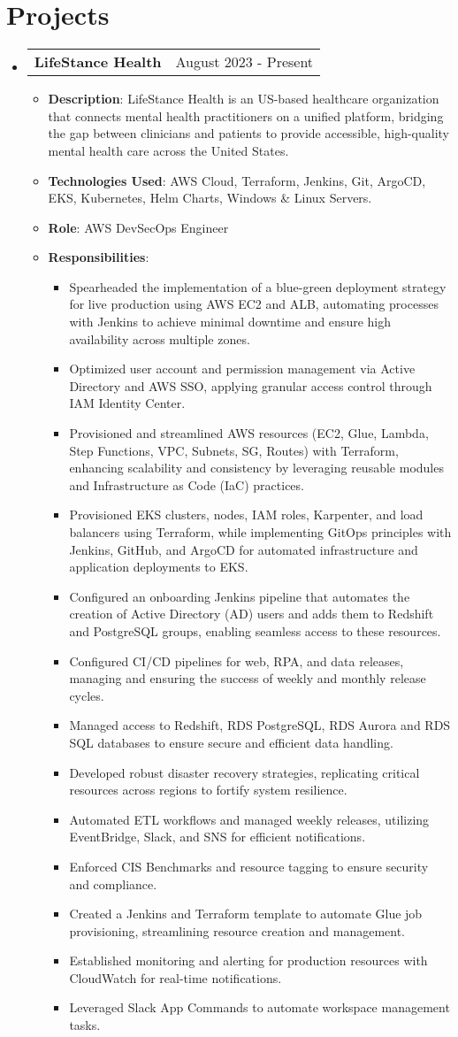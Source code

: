 \documentclass[a4paper,10pt]{article}
\makeatletter
\newcommand{\resumeItem}[1]{
  \item\small{
    {#1 \vspace{-2pt}}
  }
}
\newcommand{\resumeProjectHeading}[2]{
  \item
  \begin{tabular*}{\textwidth}[t]{l@{\extracolsep{\fill}}r}
    \small\textbf{#1} & #2 \\
  \end{tabular*}
}
\newcommand{\resumeSubHeadingListStart}{\begin{itemize}[leftmargin=0.15in, label={}]}
\newcommand{\resumeSubHeadingListEnd}{\end{itemize}}
\newcommand{\resumeItemListStart}{\begin{itemize}}
\newcommand{\resumeItemListEnd}{\end{itemize}}
\makeatother
\begin{document}
\section{Projects}
\resumeSubHeadingListStart
  \resumeProjectHeading
    {LifeStance Health}{August 2023 - Present}
    \resumeItemListStart
      \resumeItem{\textbf{Description}: LifeStance Health is an US-based healthcare organization that connects mental health practitioners on a unified platform, bridging the gap between clinicians and patients to provide accessible, high-quality mental health care across the United States.}
      \resumeItem{\textbf{Technologies Used}: AWS Cloud, Terraform, Jenkins, Git, ArgoCD, EKS, Kubernetes, Helm Charts, Windows \& Linux Servers.}
      \resumeItem{\textbf{Role}: AWS DevSecOps Engineer}
      \resumeItem{\textbf{Responsibilities}:}
      \resumeItemListStart
        \resumeItem{Spearheaded the implementation of a blue-green deployment strategy for live production using AWS EC2 and ALB, automating processes with Jenkins to achieve minimal downtime and ensure high availability across multiple zones.}
    \resumeItem{Optimized user account and permission management via Active Directory and AWS SSO, applying granular access control through IAM Identity Center.}
    \resumeItem{Provisioned and streamlined AWS resources (EC2, Glue, Lambda, Step Functions, VPC, Subnets, SG, Routes) with Terraform, enhancing scalability and consistency by leveraging reusable modules and Infrastructure as Code (IaC) practices.}
    \resumeItem{Provisioned EKS clusters, nodes, IAM roles, Karpenter, and load balancers using Terraform, while implementing GitOps principles with Jenkins, GitHub, and ArgoCD for automated infrastructure and application deployments to EKS.}
    \resumeItem{Configured an onboarding Jenkins pipeline that automates the creation of Active Directory (AD) users and adds them to Redshift and PostgreSQL groups, enabling seamless access to these resources.}
    \resumeItem{Configured CI/CD pipelines for web, RPA, and data releases, managing and ensuring the success of weekly and monthly release cycles.}
    \resumeItem{Managed access to Redshift, RDS PostgreSQL, RDS Aurora and RDS SQL databases to ensure secure and efficient data handling.}
    \resumeItem{Developed robust disaster recovery strategies, replicating critical resources across regions to fortify system resilience.}
    \resumeItem{Automated ETL workflows and managed weekly releases, utilizing EventBridge, Slack, and SNS for efficient notifications.}
    \resumeItem{Enforced CIS Benchmarks and resource tagging to ensure security and compliance.}
    \resumeItem{Created a Jenkins and Terraform template to automate Glue job provisioning, streamlining resource creation and management.}
    \resumeItem{Established monitoring and alerting for production resources with CloudWatch for real-time notifications.}
    \resumeItem{Leveraged Slack App Commands to automate workspace management tasks.}
      \resumeItemListEnd
    \resumeItemListEnd
\resumeSubHeadingListEnd
\end{document}
